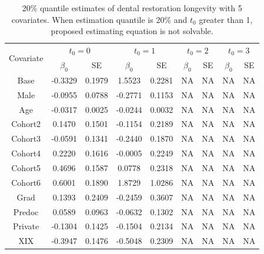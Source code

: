\documentclass[12pt]{article}
\begin{document}
	\begin{table}[H]
		\caption{20\% quantile estimates of dental restoration longevity with 5 covariates. When estimation quantile is 20\% and $t_0$ greater than 1, proposed estimating equation is not solvable.}
		\centering
		\begin{tabular}{|c|c|c|c|c|c|c|c|c|}
			\hline
			\multirow{2}{*}{Covariate} & \multicolumn{2}{c|}{$t_0=0$} & \multicolumn{2}{c|}{$t_0=1$} & \multicolumn{2}{c|}{$t_0=2$} & \multicolumn{2}{c|}{$t_0=3$}\\ 
			\cline{2-9}
			& $\beta_0$ & SE & $\beta_0$ & SE & $\beta_0$ & SE & $\beta_0$ & SE\\
			\hline\hline
			Base & -0.3329 & 0.1979 & 1.5523 & 0.2281 & NA & NA & NA & NA \\ 
			Male & -0.0955 & 0.0788 & -0.2771 & 0.1153 & NA & NA & NA & NA \\ 
			Age & -0.0317 & 0.0025 & -0.0244 & 0.0032 & NA & NA & NA & NA \\ 
			Cohort2 & 0.1470 & 0.1501 & -0.1154 & 0.2189 & NA & NA & NA & NA \\ 
			Cohort3 & -0.0591 & 0.1341 & -0.2440 & 0.1870 & NA & NA & NA & NA \\ 
			Cohort4 & 0.2220 & 0.1616 & -0.0005 & 0.2249 & NA & NA & NA & NA \\ 
			Cohort5 & 0.4696 & 0.1587 & 0.0778 & 0.2318 & NA & NA & NA & NA \\ 
			Cohort6 & 0.6001 & 0.1890 & 1.8729 & 1.0286 & NA & NA & NA & NA \\ 
			Grad & 0.1393 & 0.2409 & -0.2459 & 0.3607 & NA & NA & NA & NA \\ 
			Predoc & 0.0589 & 0.0963 & -0.0632 & 0.1302 & NA & NA & NA & NA \\ 
			Private & -0.1304 & 0.1425 & -0.1504 & 0.2134 & NA & NA & NA & NA \\ 
			XIX & -0.3947 & 0.1476 & -0.5048 & 0.2309 & NA & NA & NA & NA \\
			\hline
		\end{tabular}
	\end{table}
\end{document}

